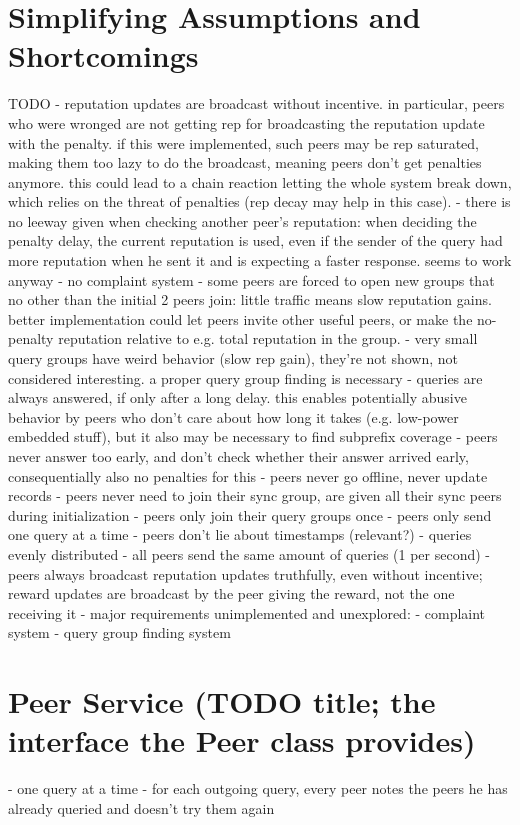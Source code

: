\section{Simplifying Assumptions and Shortcomings}
TODO
- reputation updates are broadcast without incentive. in particular, peers who
  were wronged are not getting rep for broadcasting the reputation update with
  the penalty. if this were implemented, such peers may be rep saturated, making
  them too lazy to do the broadcast, meaning peers don't get penalties anymore.
  this could lead to a chain reaction letting the whole system break down, which
  relies on the threat of penalties (rep decay may help in this case).
- there is no leeway given when checking another peer's reputation: when
  deciding the penalty delay, the current reputation is used, even if the sender
  of the query had more reputation when he sent it and is expecting a faster
  response. seems to work anyway
- no complaint system
- some peers are forced to open new groups that no other than the initial 2
  peers join: little traffic means slow reputation gains.
  better implementation could let peers invite other useful peers, or make the
  no-penalty reputation relative to e.g. total reputation in the group.
- very small query groups have weird behavior (slow rep gain), they're not
  shown, not considered interesting. a proper query group finding is necessary
- queries are always answered, if only after a long delay. this enables
  potentially abusive behavior by peers who don't care about how long it takes
  (e.g. low-power embedded stuff), but it also may be necessary to find
  subprefix coverage
- peers never answer too early, and don't check whether their answer arrived
  early, consequentially also no penalties for this
- peers never go offline, never update records
- peers never need to join their sync group, are given all their sync peers
  during initialization
- peers only join their query groups once
- peers only send one query at a time
- peers don't lie about timestamps (relevant?)
- queries evenly distributed
- all peers send the same amount of queries (1 per second)
- peers always broadcast reputation updates truthfully, even without incentive;
  reward updates are broadcast by the peer giving the reward, not the one
  receiving it
- major requirements unimplemented and unexplored:
    - complaint system
    - query group finding system

\section{Peer Service (TODO title; the interface the Peer class provides)}
- one query at a time
- for each outgoing query, every peer notes the peers he has already queried and
  doesn't try them again
